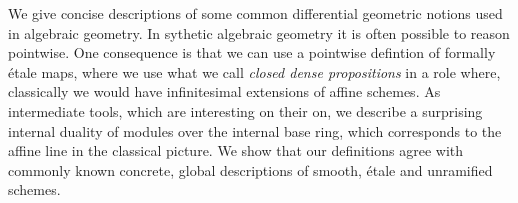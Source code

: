 We give concise descriptions of some common differential geometric notions used in algebraic geometry.
In sythetic algebraic geometry it is often possible to reason pointwise.
One consequence is that we can use a pointwise defintion of formally étale maps,
where we use what we call \emph{closed dense propositions} in a role where, classically we would have infinitesimal extensions of affine schemes.
As intermediate tools, which are interesting on their on, we describe a surprising internal duality of modules over the internal base ring, which corresponds to the affine line in the classical picture.
We show that our definitions agree with commonly known concrete, global descriptions of smooth, étale and unramified schemes.